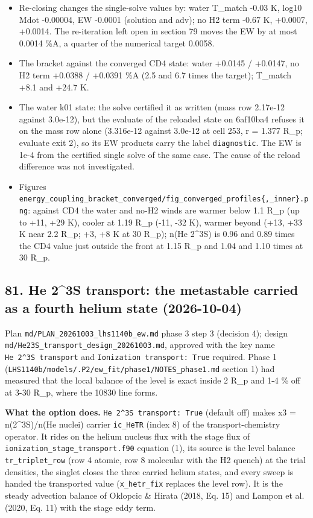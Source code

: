 \documentclass[english,a4paper]{my_memo}
\providecommand{\tightlist}{\setlength{\itemsep}{0pt}\setlength{\parskip}{0pt}}
\begin{document}
\begin{itemize}
\tightlist
\item
  Re-closing changes the single-solve values by: water T\_match -0.03 K,
  log10 Mdot -0.00004, EW -0.0001 (solution and adv); no H2 term -0.67 K,
  +0.0007, +0.0014. The re-iteration left open in section 79 moves the EW by
  at most 0.0014 \%A, a quarter of the numerical target 0.0058.
\item
  The bracket against the converged CD4 state: water +0.0145 / +0.0147,
  no H2 term +0.0388 / +0.0391 \%A (2.5 and 6.7 times the target); T\_match
  +8.1 and +24.7 K.
\item
  The water k01 state: the solve certified it as written (mass row 2.17e-12
  against 3.0e-12), but the evaluate of the reloaded state on 6af10ba4
  refuses it on the mass row alone (3.316e-12 against 3.0e-12 at cell 253,
  r = 1.377 R\_p; evaluate exit 2), so its EW products carry the label
  \texttt{diagnostic}. The EW is 1e-4 from the certified single solve of the same
  case. The cause of the reload difference was not investigated.
\item
  Figures \texttt{energy\_coupling\_bracket\_converged/fig\_converged\_profiles\{,\_inner\}.png}:
  against CD4 the water and no-H2 winds are warmer below 1.1 R\_p (up to +11,
  +29 K), cooler at 1.19 R\_p (-11, -32 K), warmer beyond (+13, +33 K near
  2.2 R\_p; +3, +8 K at 30 R\_p); n(He 2\^{}3S) is 0.96 and 0.89 times the CD4
  value just outside the front at 1.15 R\_p and 1.04 and 1.10 times at 30 R\_p.
\end{itemize}

\subsection{81. He 2\^{}3S transport: the metastable carried as a fourth helium state (2026-10-04)}\label{81-he-23s-transport-the-metastable-carried-as-a-fourth-helium-state-2026-10-04}

Plan \texttt{md/PLAN\_20261003\_lhs1140b\_ew.md} phase 3 step 3 (decision 4); design
\texttt{md/He23S\_transport\_design\_20261003.md}, approved with the key name
\texttt{He\ 2\^{}3S\ transport} and \texttt{Ionization\ transport:\ True} required. Phase 1
(\texttt{LHS1140b/models/.P2/ew\_fit/phase1/NOTES\_phase1.md} section 1) had measured
that the local balance of the level is exact inside 2 R\_p and 1-4 \% off at
3-30 R\_p, where the 10830 line forms.

\textbf{What the option does.} \texttt{He\ 2\^{}3S\ transport:\ True} (default off) makes
x3 = n(2\^{}3S)/n(He nuclei) carrier \texttt{ic\_HeTR} (index 8) of the
transport-chemistry operator. It rides on the helium nucleus flux with the
stage flux of \texttt{ionization\_stage\_transport.f90} equation (1), its source is
the level balance \texttt{tr\_triplet\_row} (row 4 atomic, row 8 molecular with the
H2 quench) at the trial densities, the singlet closes the three carried
helium states, and every sweep is handed the transported value
(\texttt{x\_hetr\_fix} replaces the level row). It is the steady advection balance
of Oklopcic \& Hirata (2018, Eq. 15) and Lampon et al. (2020, Eq. 11) with
the stage eddy term.
\end{document}
